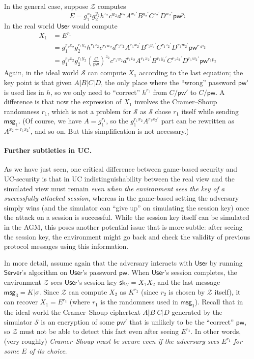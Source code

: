\documentclass[10pt,a4paper]{article}
\newcommand{\simulator}{\mathcal{S}}
\newcommand{\env}{\mathcal{Z}}
\newcommand{\user}{\mathsf{User}}
\newcommand{\sk}{\mathsf{sk}}
\newcommand{\pw}{\mathsf{pw}}
\newcommand{\server}{\mathsf{Server}}
\newcommand{\msg}[1]{\mathsf{msg}_{#1}}
\begin{document}
In the general case, suppose $\env$ computes
\[
E = g_1^{x_2}g_2^{y_2}h^{z_2}c^{w_2}d^{v_2}A^{x_2'}B^{y_2'}C^{z_2'}D^{w_2'}\pw^{p_2}
\]
In the real world $\user$ would compute
\begin{align*}
X_1 &= E^{r_1} \\
    &= g_1^{r_1x_2} g_2^{r_1y_2} h^{r_1z_2} c^{r_1w_2} d^{r_1v_2} A^{r_1x_2'} B^{r_1y_2'} C^{r_1z_2'} D^{r_1w_2'} \pw^{r_1p_2} \\
    &= g_1^{r_1x_2} g_2^{r_1y_2} \left(\frac{C}{\pw}\right)^{z_2} c^{r_1w_2} d^{r_1v_2} A^{r_1x_2'} B^{r_1y_2'} C^{r_1z_2'} D^{r_1w_2'} \pw^{r_1p_2}
\end{align*}	
Again, in the ideal world $\simulator$ can compute $X_1$ according to the last equation; the key point is that given $A|B|C|D$, the only place where the ``wrong'' password $\pw'$ is used lies in $h$, so we only need to ``correct'' $h^{r_1}$ from $C/\pw'$ to $C/\pw$. A difference is that now the expression of $X_1$ involves the Cramer--Shoup randomness $r_1$, which is not a problem for $\simulator$ as $\simulator$ chose $r_1$ itself while sending $\msg{1}$. (Of course, we have $A = g_1^{r_1}$, so the $g_1^{r_1x_2} A^{r_1x_2'}$ part can be rewritten as $A^{x_2+r_1x_2'}$, and so on. But this simplification is not necessary.)

\paragraph{Further subtleties in UC.}
As we have just seen, one critical difference between game-based security and UC-security is that in UC indistinguishability between the real view and the simulated view must remain \emph{even when the environment sees the key of a successfully attacked session}, whereas in the game-based setting the adversary simply wins (and the simulator can ``give up'' on simulating the session key) once the attack on a session is successful. While the session key itself can be simulated in the AGM, this poses another potential issue that is more subtle: after seeing the session key, the environment might go back and check the validity of previous protocol messages using this information.

In more detail, assume again that the adversary interacts with $\user$ by running $\server$'s algorithm on $\user$'s password $\pw$. When $\user$'s session completes, the environment $\env$ sees $\user$'s session key $\sk_U = X_1X_2$ and the last message $\msg{3} = K|\sigma$. Since $\env$ can compute $X_2$ as $K^{r_2}$ (since $r_2$ is chosen by $\env$ itself), it can recover $X_1 = E^{r_1}$ (where $r_1$ is the randomness used in $\msg{1}$). Recall that in the ideal world the Cramer--Shoup ciphertext $A|B|C|D$ generated by the simulator $\simulator$ is an encryption of some $\pw'$ that is unlikely to be the ``correct'' $\pw$, so $\env$ must not be able to detect this fact even after seeing $E^{r_1}$. In other words, (very roughly) \emph{Cramer--Shoup must be secure even if the adversary sees $E^{r_1}$ for some $E$ of its choice}.
\end{document}
